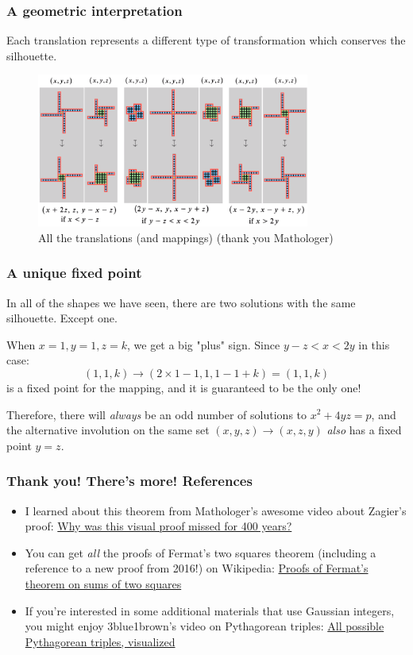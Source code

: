\documentclass{beamer}
\begin{document}
\begin{frame}
	\frametitle{A geometric interpretation}

	Each translation represents a different type of transformation which conserves the silhouette.
	\begin{figure}
	\begin{center}
             \includegraphics[width=0.8\textwidth]{windmills.png}
        \end{center}
		\caption*{All the translations (and mappings) (thank you Mathologer)}
                \label{fig:windmill_mathologer}
	\end{figure}
\end{frame}

\begin{frame}
	\frametitle{A unique fixed point}

	In all of the shapes we have seen, there are two solutions with the same silhouette. Except one.

	When $x=1, y=1, z=k$, we get a big "plus" sign. Since $y-z<x<2y$ in this case:
	\[ (1,1,k) \rightarrow (2\times 1 - 1, 1, 1 - 1 + k) = (1,1,k) \]
	is a fixed point for the mapping, and it is guaranteed to be the only one!

	Therefore, there will {\em always} be an odd number of solutions to $x^2+4yz = p$, and the
	alternative involution on the same set $(x,y,z) \rightarrow (x,z,y)$ {\em also} has a fixed
	point $y = z$.

\end{frame}

\begin{frame}
	\frametitle{Thank you! There's more! References}

	\begin{itemize}
		\item I learned about this theorem from Mathologer's awesome video about Zagier's proof:
		\href{https://www.youtube.com/watch?v=DjI1NICfjOk}{Why was this visual proof missed
		for 400 years?}

	\item You can get {\em all} the proofs of Fermat's two squares theorem (including
	a reference to a new proof from 2016!) on Wikipedia:
	\href{https://bit.ly/3gpMy7x}{Proofs of Fermat's theorem on sums of two squares}
	
	\item If you're interested in some additional materials that use Gaussian integers, you might
	enjoy 3blue1brown's video on Pythagorean triples:
	\href{https://www.youtube.com/watch?v=QJYmyhnaaek}{All possible Pythagorean triples, visualized}
	\end{itemize}
\end{frame}
\end{document}
